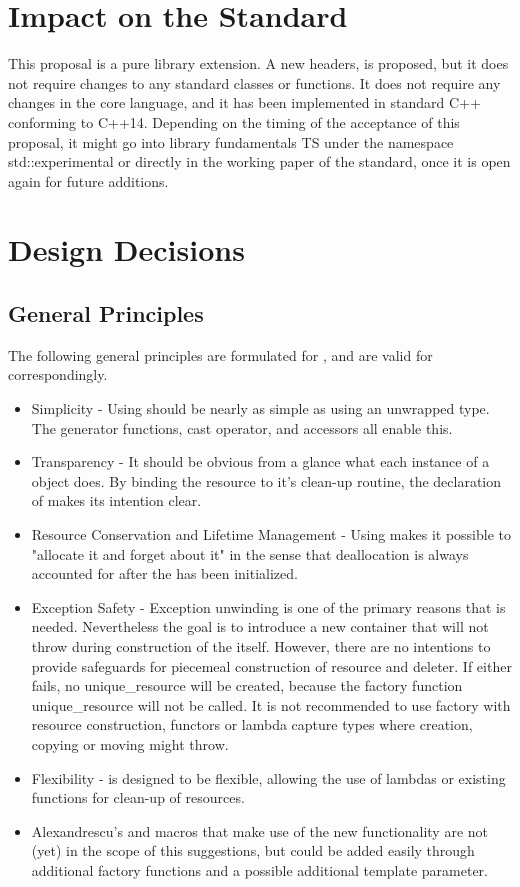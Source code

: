 \documentclass[ebook,11pt,article]{memoir}
\begin{document}
\chapter{Impact on the Standard}
This proposal is a pure library extension. A new headers,  is proposed, but it does not require changes to any standard classes or functions. It does not require any changes in the core language, and it has been implemented in standard C++ conforming to C++14. Depending on the timing of the acceptance of this proposal, it might go into library fundamentals TS under the namespace std::experimental or directly in the working paper of the standard, once it is open again for future additions.

\chapter{Design Decisions}
\section{General Principles}
The following general principles are formulated for , and are valid for  correspondingly.
\begin{itemize}
\item Simplicity - Using  should be nearly as simple as using an unwrapped type.  The generator functions, cast operator, and accessors all enable this.
\item Transparency - It should be obvious from a glance what each instance of a  object does.  By binding the resource to it's clean-up routine, the declaration of  makes its intention clear.
\item Resource Conservation and Lifetime Management - Using  makes it possible to "allocate it and forget about it" in the sense that deallocation is always accounted for after the  has been initialized.
\item Exception Safety - Exception unwinding is one of the primary reasons that  is needed.  Nevertheless the goal is to introduce a new container that will not throw during construction of the  itself. However, there are no intentions to provide safeguards for piecemeal construction of resource and deleter. If either fails, no unique_resource will be created, because the factory function unique_resource will not be called. It is not recommended to use  factory with resource construction, functors or lambda capture types where creation, copying or moving might throw.
\item Flexibility -  is designed to be flexible, allowing the use of lambdas or existing functions for clean-up of resources. 
\item Alexandrescu's  and  macros that make use of the new  functionality are not (yet) in the scope of this suggestions, but could be added easily through additional factory functions and a possible additional template parameter.
\end{itemize}
\end{document}
